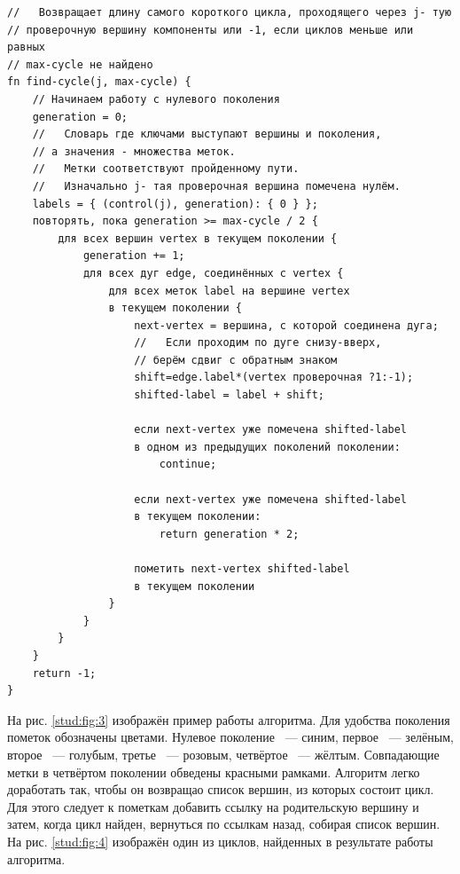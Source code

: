 \documentclass[14pt]{mmcs_article}
\begin{document}
\begin{lstlisting}[caption={Алгоритм поиска циклов}, label=stud:lst:1]
//   Возвращает длину самого короткого цикла, проходящего через j- тую
// проверочную вершину компоненты или -1, если циклов меньше или равных
// max-cycle не найдено
fn find-cycle(j, max-cycle) {
    // Начинаем работу с нулевого поколения
    generation = 0;
    //   Словарь где ключами выступают вершины и поколения,
    // а значения - множества меток.
    //   Метки соответствуют пройденному пути.
    //   Изначально j- тая проверочная вершина помечена нулём.
    labels = { (control(j), generation): { 0 } };
    повторять, пока generation >= max-cycle / 2 { 
        для всех вершин vertex в текущем поколении {
            generation += 1;
            для всех дуг edge, соединённых с vertex {
                для всех меток label на вершине vertex
                в текущем поколении {
                    next-vertex = вершина, с которой соединена дуга;
                    //   Если проходим по дуге снизу-вверх,
                    // берём сдвиг с обратным знаком
                    shift=edge.label*(vertex проверочная ?1:-1);
                    shifted-label = label + shift;

                    если next-vertex уже помечена shifted-label
                    в одном из предыдущих поколений поколении:
                        continue;

                    если next-vertex уже помечена shifted-label 
                    в текущем поколении:
                        return generation * 2;

                    пометить next-vertex shifted-label
                    в текущем поколении
                }
            }
        }
    }
    return -1;
}
\end{lstlisting}

На рис. \ref{stud:fig:3} изображён пример работы алгоритма. Для удобства поколения пометок обозначены цветами. Нулевое поколение ~--- синим, первое ~--- зелёным, второе ~--- голубым, третье ~--- розовым, четвёртое ~--- жёлтым. Совпадающие метки в четвёртом поколении обведены красными рамками. Алгоритм легко доработать так, чтобы он возвращао список вершин, из которых состоит цикл. Для этого следует к пометкам добавить ссылку на родительскую вершину и затем, когда цикл найден, вернуться по ссылкам назад, собирая список вершин. На рис. \ref{stud:fig:4} изображён один из циклов, найденных в результате работы алгоритма. 
\end{document}
